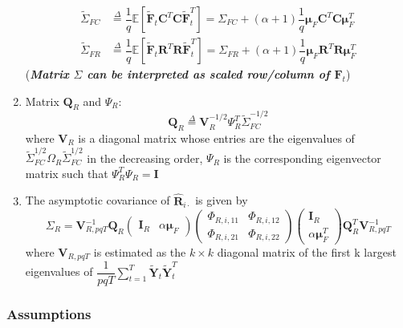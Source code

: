 \documentclass{article}[12pt]
\begin{document}
\begin{enumerate}
    \begin{equation} 
       \begin{split}
           \widetilde{\Sigma}_{FC} &\overset{\Delta}{=} \dfrac{1}{q}\mathbb{E}\left[\mathbf{\widetilde{F}}_t\mathbf{C}^T\mathbf{C}\mathbf{\widetilde{F}}_t^T\right] =   \Sigma_{FC} + (\alpha + 1)\dfrac{1}{q}\bm{\mu}_F\mathbf{C}^T\mathbf{C}\bm{\mu}_F^T \\
           \widetilde{\Sigma}_{FR} & \overset{\Delta}{=} \dfrac{1}{q}\mathbb{E}\left[\mathbf{\widetilde{F}}_t\mathbf{R}^T\mathbf{R}\mathbf{\widetilde{F}}_t^T\right] =   \Sigma_{FR} + (\alpha + 1)\dfrac{1}{q}\bm{\mu}_F\mathbf{R}^T\mathbf{R}\bm{\mu}_F^T 
       \end{split}
    \end{equation}
    \noindent (\textbf{\textit{Matrix $\Sigma$ can be interpreted as scaled row/column of $\mathbf{F}_t$}})
    \item Matrix $\mathbf{Q}_R$ and $\Psi_R$:
    \begin{equation}
        \mathbf{Q}_R \overset{\Delta}{=} \mathbf{V}_R^{-1/2}\Psi_R^{T}\widetilde{\Sigma}_{FC}^{-1/2}
    \end{equation}
    where $\mathbf{V}_R$ is a diagonal matrix whose entries are the eigenvalues of $\widetilde{\Sigma}_{FC}^{1/2}\Omega_R\widetilde{\Sigma}_{FC}^{1/2}$ in the decreasing order, $\Psi_R$ is the corresponding eigenvector matrix such that $\Psi_R^T\Psi_R=\mathbf{I}$
    \item The asymptotic covariance of $\mathbf{\widehat{R}}_{i\cdot}$ is given by
    $$
    \Sigma_R = \mathbf{V}_{R,pqT}^{-1}\mathbf{Q}_R
    \begin{pmatrix}
        \mathbf{I}_R & \alpha\bm{\mu}_F
    \end{pmatrix}	
    \begin{pmatrix}
        \Phi_{R,i,11} & \Phi_{R,i,12} \\
        \Phi_{R,i,21} & \Phi_{R,i,22}
    \end{pmatrix}
    \begin{pmatrix}
        \mathbf{I}_R \\ \alpha\bm{\mu}_F^T
    \end{pmatrix}	
    \mathbf{Q}_R^T\mathbf{V}_{R,pqT}^{-1}
    $$
    where $\mathbf{V}_{R,pqT}$ is estimated as the $k \times k$ diagonal matrix of the first k largest eigenvalues of $\dfrac{1}{pqT}\sum_{t=1}^T\mathbf{\widetilde{Y}}_t\mathbf{\widetilde{Y}}_t^T$
\end{enumerate}


\subsubsection{Assumptions}
\end{document}
